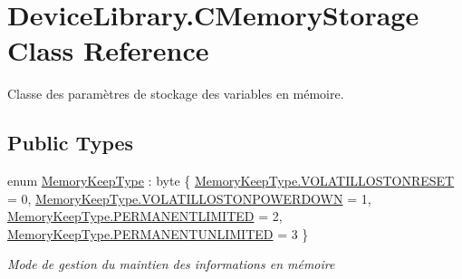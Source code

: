 \hypertarget{class_device_library_1_1_c_memory_storage}{}\section{Device\+Library.\+C\+Memory\+Storage Class Reference}
\label{class_device_library_1_1_c_memory_storage}


Classe des paramètres de stockage des variables en mémoire.  


\subsection*{Public Types}
\begin{DoxyCompactItemize}
\item 
enum \mbox{\hyperlink{class_device_library_1_1_c_memory_storage_a212a4301a9ee4074c52046fc8b36fb7a}{Memory\+Keep\+Type}} \+: byte \{ \mbox{\hyperlink{class_device_library_1_1_c_memory_storage_a212a4301a9ee4074c52046fc8b36fb7aa963ae5bd1a56f051a5218b3a8b3f7e2a}{Memory\+Keep\+Type.\+V\+O\+L\+A\+T\+I\+L\+L\+O\+S\+T\+O\+N\+R\+E\+S\+ET}} = 0, 
\mbox{\hyperlink{class_device_library_1_1_c_memory_storage_a212a4301a9ee4074c52046fc8b36fb7aa6ca056f5fe86139cd47875ac8d244a3e}{Memory\+Keep\+Type.\+V\+O\+L\+A\+T\+I\+L\+L\+O\+S\+T\+O\+N\+P\+O\+W\+E\+R\+D\+O\+WN}} = 1, 
\mbox{\hyperlink{class_device_library_1_1_c_memory_storage_a212a4301a9ee4074c52046fc8b36fb7aaab49f8e53c5270f77a021603d479de15}{Memory\+Keep\+Type.\+P\+E\+R\+M\+A\+N\+E\+N\+T\+L\+I\+M\+I\+T\+ED}} = 2, 
\mbox{\hyperlink{class_device_library_1_1_c_memory_storage_a212a4301a9ee4074c52046fc8b36fb7aa5aa3ba7df83ac7f584293cb274ae3fa9}{Memory\+Keep\+Type.\+P\+E\+R\+M\+A\+N\+E\+N\+T\+U\+N\+L\+I\+M\+I\+T\+ED}} = 3
 \}
\begin{DoxyCompactList}\small\item\em Mode de gestion du maintien des informations en mémoire \end{DoxyCompactList}\end{DoxyCompactItemize}
